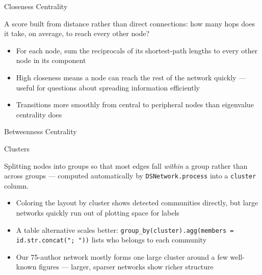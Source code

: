 \documentclass[8pt,aspectratio=169]{beamer}
\begin{document}
\begin{textframe}{Closeness Centrality}

A score built from distance rather than direct connections: how many hops does it take, on average, to reach every other node?

\begin{itemize}
\item For each node, sum the reciprocals of its shortest-path lengths to every other node in its component
\item High closeness means a node can reach the rest of the network quickly --- useful for questions about spreading information efficiently
\item Transitions more smoothly from central to peripheral nodes than eigenvalue centrality does
\end{itemize}

\end{textframe}

\begin{rightframe}{Betweenness Centrality}
\end{rightframe}

\begin{textframe}{Clusters}

Splitting nodes into groups so that most edges fall \textit{within} a group rather than across groups --- computed automatically by \texttt{DSNetwork.process} into a \texttt{cluster} column.

\begin{itemize}
\item Coloring the layout by cluster shows detected communities directly, but large networks quickly run out of plotting space for labels
\item A table alternative scales better: \texttt{group\_by(cluster).agg(members = id.str.concat("; "))} lists who belongs to each community
\item Our 75-author network mostly forms one large cluster around a few well-known figures --- larger, sparser networks show richer structure
\end{itemize}

\end{textframe}
\end{document}
